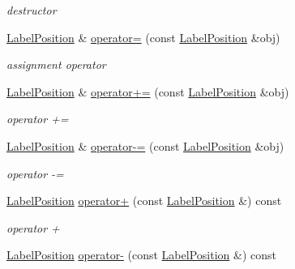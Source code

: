 \begin{DoxyCompactItemize}
\begin{DoxyCompactList}\small\item\em destructor \end{DoxyCompactList}\item 
\hypertarget{classsinsy_1_1LabelPosition_aa399e69f3337b88c768e574350bf2274}{\hyperlink{classsinsy_1_1LabelPosition}{\-Label\-Position} \& \hyperlink{classsinsy_1_1LabelPosition_aa399e69f3337b88c768e574350bf2274}{operator=} (const \hyperlink{classsinsy_1_1LabelPosition}{\-Label\-Position} \&obj)}\label{classsinsy_1_1LabelPosition_aa399e69f3337b88c768e574350bf2274}

\begin{DoxyCompactList}\small\item\em assignment operator \end{DoxyCompactList}\item 
\hypertarget{classsinsy_1_1LabelPosition_a1c30e2a6a0a41941ac016b265c3f6c39}{\hyperlink{classsinsy_1_1LabelPosition}{\-Label\-Position} \& \hyperlink{classsinsy_1_1LabelPosition_a1c30e2a6a0a41941ac016b265c3f6c39}{operator+=} (const \hyperlink{classsinsy_1_1LabelPosition}{\-Label\-Position} \&obj)}\label{classsinsy_1_1LabelPosition_a1c30e2a6a0a41941ac016b265c3f6c39}

\begin{DoxyCompactList}\small\item\em operator += \end{DoxyCompactList}\item 
\hypertarget{classsinsy_1_1LabelPosition_aafd20041d722265ba62dcae6c46a0dd2}{\hyperlink{classsinsy_1_1LabelPosition}{\-Label\-Position} \& \hyperlink{classsinsy_1_1LabelPosition_aafd20041d722265ba62dcae6c46a0dd2}{operator-\/=} (const \hyperlink{classsinsy_1_1LabelPosition}{\-Label\-Position} \&obj)}\label{classsinsy_1_1LabelPosition_aafd20041d722265ba62dcae6c46a0dd2}

\begin{DoxyCompactList}\small\item\em operator -\/= \end{DoxyCompactList}\item 
\hypertarget{classsinsy_1_1LabelPosition_a7c3ff6672f9ae612a88d6e1bacfcf759}{\hyperlink{classsinsy_1_1LabelPosition}{\-Label\-Position} \hyperlink{classsinsy_1_1LabelPosition_a7c3ff6672f9ae612a88d6e1bacfcf759}{operator+} (const \hyperlink{classsinsy_1_1LabelPosition}{\-Label\-Position} \&) const }\label{classsinsy_1_1LabelPosition_a7c3ff6672f9ae612a88d6e1bacfcf759}

\begin{DoxyCompactList}\small\item\em operator + \end{DoxyCompactList}\item 
\hypertarget{classsinsy_1_1LabelPosition_ac4c23a1f9a09fbee0ea87779a8640ee8}{\hyperlink{classsinsy_1_1LabelPosition}{\-Label\-Position} \hyperlink{classsinsy_1_1LabelPosition_ac4c23a1f9a09fbee0ea87779a8640ee8}{operator-\/} (const \hyperlink{classsinsy_1_1LabelPosition}{\-Label\-Position} \&) const }\label{classsinsy_1_1LabelPosition_ac4c23a1f9a09fbee0ea87779a8640ee8}


\end{DoxyCompactItemize}
